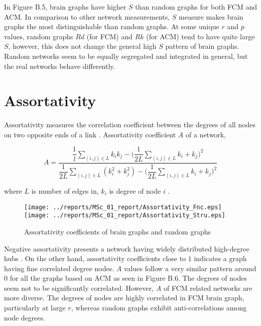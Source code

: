 In Figure B.5, brain graphs have higher $S$ than random graphs for both FCM and ACM. In comparison to other network measurements, $S$ measure makes brain graphs the most distinguishable than random graphs. At some unique $r$ and $p$ values, random graphs $Rd$ (for FCM) and $Rk$ (for ACM) tend to have quite large $S$, however, this does not change the general high $S$ pattern of brain graphs. Random networks seem to be equally segregated and integrated in general, but the real networks behave differently. 



\section{Assortativity}

Assortativity measures the correlation coefficient between the degrees of all nodes on two opposite ends of a link \citep{RUB10}. Assortativity coefficient $A$ of a network, 

\begin{equation}
A = \frac{\dfrac{1}{l} \sum\limits_{(i,j) \in L}  k_i k_j -  \Big ( \dfrac{1}{2L} \sum\limits_{(i,j) \in L}k_i + k_j  \Big )^2}{\dfrac{1}{2L}\sum\limits_{(i,j) \in L} ( k_i^2+  k_j^2) -\Big ( \dfrac{1}{2L} \sum\limits_{(i,j) \in L}k_i + k_j  \Big )^2 }
\end{equation}

where $L$ is number of edges in, $k_i$ is degree of node $i$ \citep{NEW02a}.


\begin{figure}[htbp]
 
  \centering
	 \texttt{[image: ../reports/MSc\_01\_report/Assortativity\_Fnc.eps]}
	 \texttt{[image: ../reports/MSc\_01\_report/Assortativity\_Stru.eps]}
  \caption[Assortativity]{Assortativity coefficients of brain graphs and random graphs} 
    \label{fig:Assortativity}
 	
\end{figure}

Negative assortativity presents a network having widely distributed high-degree hubs \citep{RUB10}. On the other hand, assortativity coefficients close to $1$ indicates a graph having fine correlated degree nodes. $A$ values follow a very similar pattern around 0 for all the graphs based on ACM as seen in Figure B.6. The degrees of nodes seem not to be significantly correlated. However, $A$ of FCM related networks are more diverse. The degrees of nodes are highly correlated in FCM brain graph, particularly at large $r$, whereas random graphs exhibit anti-correlations among node degrees.   

